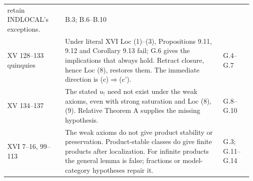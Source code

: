 \begin{center}
\begin{longtable}{p{25mm}p{96mm}p{20mm}}
retain INDLOCAL's exceptions.
& B.3; B.6--B.10\\
XV 128--133
quinquies & Under literal XVI Loc (1)--(3), Propositions 9.11,
9.12 and Corollary 9.13 fail; G.6 gives the implications that
always hold. Retract closure, hence Loc (8), restores them.
The immediate direction is (c)$\Rightarrow$(c').
& G.4--G.7\\
XV 134--137 & The stated $u_!$ need not exist under the weak
axioms, even with strong saturation and Loc (8),(9). Relative
Theorem A supplies the missing hypothesis.
& G.8--G.10\\
XVI 7--16,
99--113 & The weak axioms do not give product stability or
preservation. Product-stable classes do give finite products
after localization. For infinite products the general lemma
is false; fractions or model-category hypotheses repair it.
& G.3; G.11--G.14\\
\bottomrule
\end{longtable}
\end{center}
